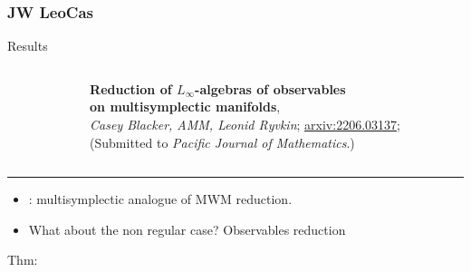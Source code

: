\documentclass[handout,10pt]{beamer}
\newcommand{\extrarule}{
		{
			\color{UniGreen}
			\par\hspace*{-\dimexpr0.5\paperwidth-0.5\textwidth}\rule[0.5\baselineskip]{\paperwidth}{0.4pt}
			\vspace{-2em}
		}
}
\begin{document}
\subsubsection{JW LeoCas}
	\begin{frame}[t]{Results}
		\begin{columns}[T]
			\begin{column}{0.2\textwidth}
				\centering
			\end{column}		
			\begin{column}{0.8\textwidth}
				\centering
				\textbf{Reduction of $L_\infty$-algebras of observables\\ on multisymplectic manifolds},
				\\
				\emph{Casey Blacker, AMM, Leonid Ryvkin}; \href{https://arxiv.org/abs/2206.03137}{arxiv:2206.03137};\\
				(Submitted to \emph{Pacific Journal of Mathematics}.)	
			\end{column}		
		\end{columns}
		\extrarule
		
		\vfill
		\begin{itemize}
			\item \cite{Blacker2020}: multisymplectic analogue of MWM reduction.
			\item What about the non regular case? \quad \alert{Observables reduction}
		\end{itemize}		
		\vfill
		\pause
		
		\begin{tcolorbox}[sidebyside,righthand width=.75\linewidth]
			Thm: \cite{Blacker2022}
			\tcblower
			

\end{tcolorbox}
\end{frame}
\end{document}

